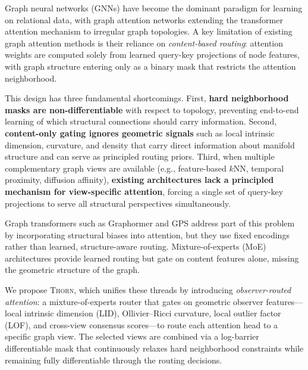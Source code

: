 \documentclass[11pt,a4paper]{article}
\newcommand{\thorn}{\textsc{Thorn}}
\begin{document}
Graph neural networks (GNNs) have become the dominant paradigm for
learning on relational data, with graph attention networks
\citep{velickovic2018graph, brody2022how} extending the transformer
attention mechanism \citep{vaswani2017attention} to irregular graph
topologies.
A key limitation of existing graph attention methods is their reliance on
\emph{content-based routing}: attention weights are computed solely from
learned query-key projections of node features, with graph structure
entering only as a binary mask that restricts the attention neighborhood.

This design has three fundamental shortcomings.
First, \textbf{hard neighborhood masks are non-differentiable} with
respect to topology, preventing end-to-end learning of which structural
connections should carry information.
Second, \textbf{content-only gating ignores geometric signals} such as
local intrinsic dimension, curvature, and density that carry direct
information about manifold structure and can serve as principled routing
priors.
Third, when multiple complementary graph views are available (e.g.,
feature-based $k$NN, temporal proximity, diffusion affinity),
\textbf{existing architectures lack a principled mechanism for
view-specific attention}, forcing a single set of query-key projections
to serve all structural perspectives simultaneously.

Graph transformers such as Graphormer \citep{ying2021transformers} and
GPS \citep{rampasek2022recipe} address part of this problem by
incorporating structural biases into attention, but they use fixed
encodings rather than learned, structure-aware routing.
Mixture-of-experts (MoE) architectures
\citep{shazeer2017outrageously, fedus2022switch} provide learned routing
but gate on content features alone, missing the geometric structure of
the graph.

We propose \thorn{}, which unifies these threads by introducing
\emph{observer-routed attention}: a mixture-of-experts router that gates
on geometric observer features---local intrinsic dimension (LID),
Ollivier--Ricci curvature, local outlier factor (LOF), and cross-view
consensus scores---to route each attention head to a specific graph view.
The selected views are combined via a log-barrier differentiable mask
that continuously relaxes hard neighborhood constraints while remaining
fully differentiable through the routing decisions.
\end{document}
